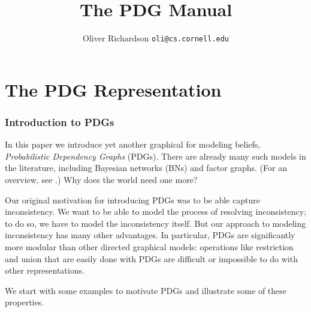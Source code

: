 \documentclass{article}
\title{The PDG Manual}
\author{Oliver Richardson  \texttt{oli@cs.cornell.edu}}
\begin{document}
	\maketitle
	\tableofcontents
	\clearpage
	\part{The PDG Representation}
	\section{Introduction to PDGs}
In this paper we introduce yet another graphical for modeling beliefs,
\emph{Probabilistic Dependency Graphs} (PDGs). There are already many
such models in the literature, including Bayesian networks (BNs) and
factor graphs. (For an overview, see \citeauthor{KF09}.)
Why does the world need one more?  

Our original motivation for introducing PDGs was to be able capture
inconsistency. We want to be able to model the process of resolving
inconsistency; to do so, we have to model the inconsistency itself. But our
approach to modeling inconsistency has many other advantages. In particular,
PDGs are significantly more modular than other directed graphical models:
operations like restriction and union that are easily done with PDGs are
difficult or impossible to do with other representations.

We start with some examples to motivate PDGs and illustrate some of these properties.  
\end{document}
